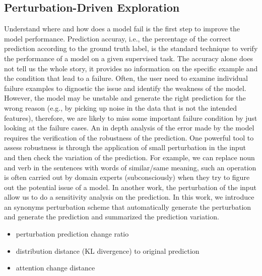 \subsection{Perturbation-Driven Exploration}

Understand where and how does a model fail is the first step to improve the
model performance.
Prediction accuray, i.e., the percentage of the correct prediction according to
the ground truth label, is the standard technique to verify the performance
of a model on a given supervised task.
%
The accuracy alone does not tell us the whole story, it provides no
information on the specific example and the condition that lead to a failure.
%
Often, the user need to examine individual failure examples to dignostic the
issue and identify the weakness of the model.
%
However, the model may be unstable and generate the right prediction for the wrong
reason (e.g., by picking up noise in the data that is not the intended features),
therefore, we are likely to miss some important failure condition by just looking
at the failure cases.
%
An in depth analysis of the error made by the model requires the verification of
the robustness of the prediction.
%
One powerful tool to assess robustness is through the application of small
perturbation in the input and then check the variation of the prediction.
%
For example, we can replace noun and verb in the sentences with words of
similar/same meaning, such an operation is often carried out by domain experts
(subconsciously) when they try to figure out the potential issue of a model.
%
In another work, the perturbation of the input allow us to do a sensitivity
analysis on the prediction.
%
In this work, we introduce an synonyms perturbation scheme that automatically
generate the perturbation and generate the prediction and summarized the prediction
variation.
%


\begin{itemize}
    \item perturbation prediction change ratio
    \item distribution distance (KL divergence) to original prediction
    \item attention change distance
\end{itemize}


